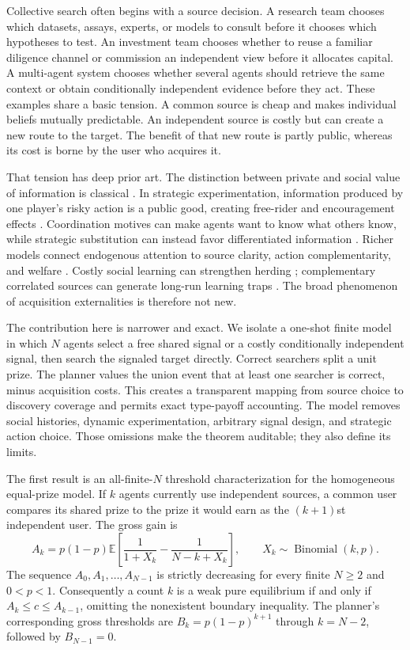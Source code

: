 \documentclass[11pt]{article}
\newcommand{\E}{\mathbb{E}}
\begin{document}
Collective search often begins with a source decision. A research team chooses
which datasets, assays, experts, or models to consult before it chooses which
hypotheses to test. An investment team chooses whether to reuse a familiar
diligence channel or commission an independent view before it allocates capital.
A multi-agent system chooses whether several agents should retrieve the same
context or obtain conditionally independent evidence before they act. These
examples share a basic tension. A common source is cheap and makes individual
beliefs mutually predictable. An independent source is costly but can create a
new route to the target. The benefit of that new route is partly public, whereas
its cost is borne by the user who acquires it.

That tension has deep prior art. The distinction between private and social
value of information is classical \citep{Hirshleifer1971}. In strategic
experimentation, information produced by one player's risky action is a public
good, creating free-rider and encouragement effects
\citep{BoltonHarris1999,KellerRadyCripps2005}. Coordination motives can make
agents want to know what others know, while strategic substitution can instead
favor differentiated information \citep{HellwigVeldkamp2009}. Richer models
connect endogenous attention to source clarity, action complementarity, and
welfare \citep{MyattWallace2012,ColomboFemminisPavan2014}. Costly social
learning can strengthen herding \citep{Ali2018}; complementary correlated
sources can generate long-run learning traps \citep{LiangMu2020}. The broad
phenomenon of acquisition externalities is therefore not new.

The contribution here is narrower and exact. We isolate a one-shot finite model
in which $N$ agents select a free shared signal or a costly conditionally
independent signal, then search the signaled target directly. Correct searchers
split a unit prize. The planner values the union event that at least one searcher
is correct, minus acquisition costs. This creates a transparent mapping from
source choice to discovery coverage and permits exact type-payoff accounting.
The model removes social histories, dynamic experimentation, arbitrary signal
design, and strategic action choice. Those omissions make the theorem auditable;
they also define its limits.

The first result is an all-finite-$N$ threshold characterization for the
homogeneous equal-prize model. If $k$ agents currently use independent sources,
a common user compares its shared
prize to the prize it would earn as the $(k+1)$st independent user. The gross
gain is
\[
 A_k=p(1-p)\E\left[\frac{1}{1+X_k}-\frac{1}{N-k+X_k}\right],
 \qquad X_k\sim\operatorname{Binomial}(k,p).
\]
The sequence $A_0,A_1,\ldots,A_{N-1}$ is strictly decreasing for every finite
$N\ge2$ and $0<p<1$. Consequently a count $k$ is a weak pure equilibrium if
and only if $A_k\le c\le A_{k-1}$, omitting the nonexistent boundary inequality.
The planner's corresponding gross thresholds are
$B_k=p(1-p)^{k+1}$ through $k=N-2$, followed by $B_{N-1}=0$.
\end{document}
